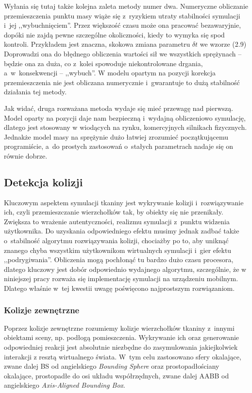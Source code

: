			Wyłania się tutaj także kolejna zaleta metody numer dwa. Numeryczne obliczanie przemieszczenia punktu masy wiąże się z~ryzykiem utraty stabilności symulacji i~jej ,,wybuchnięciem''. Przez większość czasu może ona pracować bezawaryjnie, dopóki nie zajdą pewne szczególne okoliczności, kiedy to wymyka się spod kontroli. Przykładem jest znaczna, skokowa zmiana parametru \( \delta t \) we wzorze (2.9) Doprowadzi ona do błędnego obliczenia wartości sił we wszystkich sprężynach -- będzie ona za duża, co z~kolei spowoduje niekontrolowane drgania, a~w~konsekwencji -- ,,wybuch''. W modelu opartym na pozycji korekcja przemieszczenia nie jest obliczana numerycznie i~gwarantuje to dużą stabilność działania tej metody.
			
			Jak widać, druga rozważana metoda wydaje się mieć przewagę nad pierwszą. Model oparty na pozycji daje nam bezpieczną i~wydajną obliczeniowo symulację, dlatego jest stosowany w wiodących na rynku, komercyjnych silnikach fizycznych. Jednakże model masy na sprężynie dużo łatwiej zrozumieć początkującemu programiście, a~do prostych zastosowań o~stałych parametrach nadaje się on równie dobrze.
		
		\subsection{Detekcja kolizji}
		\label{t:teoria:analiza:kolizje}
		
			Kluczowym aspektem symulacji tkaniny jest wykrywanie kolizji i~rozwiązywanie ich, czyli przemieszczanie wierzchołków tak, by obiekty się nie przenikały. Zwiększa to wrażenie autentyczności, realizmu symulacji z~punktu widzenia użytkownika. Do uzyskania odpowiedniego efektu musimy jednak zadbać także o~stabilność algorytmu rozwiązywania kolizji, chociażby po to, aby uniknąć znanego chyba wszystkim użytkownikom wirtualnych symulacji i~gier efektu ,,podrygiwania''. Obliczenia mogą pochłonąć tu bardzo dużo czasu procesora, dlatego kluczowy jest dobór odpowiednio wydajnego algorytmu, szczególnie, że w niniejszej pracy rozważa się implementację symulacji na urządzeniu mobilnym. Dlatego właśnie w~tej kwestii uwagę poświęcono najprostszym rozwiązaniom.
		
			\subsubsection{Kolizje zewnętrzne}
			\label{t:teoria:analiza:kolizje:zewn}
			
				Poprzez kolizje zewnętrzne rozumiemy kolizje wierzchołków tkaniny z~innymi obiektami sceny, np. podłogą pomieszczenia. Wykrywanie ich oraz generowanie odpowiedniej reakcji jest absolutnie niezbędne do zasymulowania jakiejkolwiek interakcji z resztą wirtualnego świata. W~tym celu zastosowano sfery okalające, zwane dalej BS od angielskiego \emph{Bounding Sphere} oraz prostopadłościany okalające, prostopadłe do osi układu współrzędnych, zwane dalej AABB od angielskiego \emph{Axis-Aligned Bounding Box}.\newpage
				
